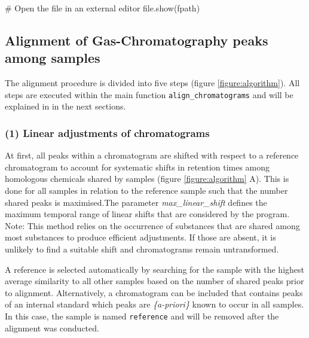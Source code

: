 \begin{Schunk}
\begin{Sinput}
# Open the file in an external editor
file.show(fpath)
\end{Sinput}
\end{Schunk}

\subsection{Alignment of Gas-Chromatography peaks among
samples}\label{alignment-of-gas-chromatography-peaks-among-samples}

The alignment procedure is divided into five steps (figure
\ref{figure:algorithm}). All steps are executed within the main function
\texttt{align\_chromatograms} and will be explained in in the next
sections.

\subsubsection{(1) Linear adjustments of
chromatograms}\label{linear-adjustments-of-chromatograms}

At first, all peaks within a chromatogram are shifted with respect to a
reference chromatogram to account for systematic shifts in retention
times among homologous chemicals shared by samples (figure
\ref{figure:algorithm} A). This is done for all samples in relation to
the reference sample such that the number shared peaks is maximised.The
parameter \emph{max\_linear\_shift} defines the maximum temporal range
of linear shifts that are considered by the program. \newline
Note: This method relies on the occurrence of substances that are shared
among most substances to produce efficient adjustments. If those are
absent, it is unlikely to find a suitable shift and chromatograms remain
untransformed. \par
A reference is selected automatically by searching for the sample with
the highest average similarity to all other samples based on the number
of shared peaks prior to alignment. Alternatively, a chromatogram can be
included that contains peaks of an internal standard which peaks are
\emph{\{a-priori\}} known to occur in all samples. In this case, the
sample is named \texttt{reference} and will be removed after the
alignment was conducted.

\newpage

